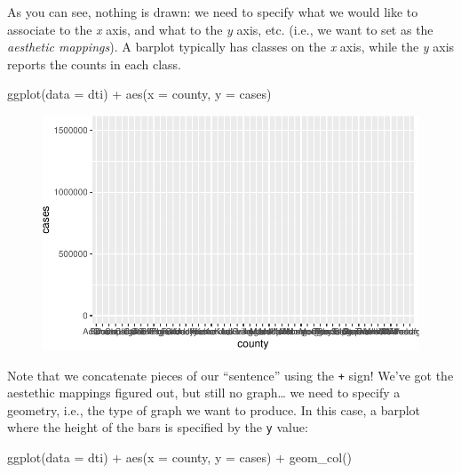 \documentclass[
  letterpaper,
  DIV=11,
  numbers=noendperiod]{scrreprt}
\newenvironment{Shaded}{\begin{snugshade}}{\end{snugshade}}
\newcommand{\AttributeTok}[1]{\textcolor[rgb]{0.40,0.45,0.13}{#1}}
\newcommand{\FunctionTok}[1]{\textcolor[rgb]{0.28,0.35,0.67}{#1}}
\newcommand{\NormalTok}[1]{\textcolor[rgb]{0.00,0.23,0.31}{#1}}
\newcommand{\SpecialCharTok}[1]{\textcolor[rgb]{0.37,0.37,0.37}{#1}}
\begin{document}
As you can see, nothing is drawn: we need to specify what we would like
to associate to the \emph{x} axis, and what to the \emph{y} axis, etc.
(i.e., we want to set as the \emph{aesthetic mappings}). A barplot
typically has classes on the \emph{x} axis, while the \emph{y} axis
reports the counts in each class.

\begin{Shaded}
\begin{Highlighting}[]
\FunctionTok{ggplot}\NormalTok{(}\AttributeTok{data =}\NormalTok{ dti) }\SpecialCharTok{+} \FunctionTok{aes}\NormalTok{(}\AttributeTok{x =}\NormalTok{ county, }\AttributeTok{y =}\NormalTok{ cases)}
\end{Highlighting}
\end{Shaded}

\begin{figure}[H]

{\centering \includegraphics{./01-dataviz_files/figure-pdf/unnamed-chunk-5-1.pdf}

}

\end{figure}

Note that we concatenate pieces of our ``sentence'' using the \texttt{+}
sign! We've got the aestethic mappings figured out, but still no
graph\ldots{} we need to specify a geometry, i.e., the type of graph we
want to produce. In this case, a barplot where the height of the bars is
specified by the \texttt{y} value:

\begin{Shaded}
\begin{Highlighting}[]
\FunctionTok{ggplot}\NormalTok{(}\AttributeTok{data =}\NormalTok{ dti) }\SpecialCharTok{+} \FunctionTok{aes}\NormalTok{(}\AttributeTok{x =}\NormalTok{ county, }\AttributeTok{y =}\NormalTok{ cases) }\SpecialCharTok{+} \FunctionTok{geom\_col}\NormalTok{()}
\end{Highlighting}
\end{Shaded}
\end{document}
